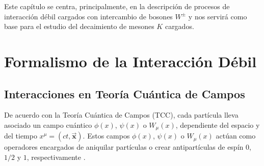 Este capítulo se centra, principalmente, en la descripción de procesos de interacción débil cargados con intercambio de bosones $W^{\pm}$ y nos servirá como base para el estudio del decaimiento de mesones $K$ cargados.

\section{Formalismo de la Interacción Débil}\label{cap:formalism}
\subsection{Interacciones en Teoría Cuántica de Campos}\label{sec:qft}
De acuerdo con la Teoría Cuántica de Campos (TCC), cada partícula lleva asociado un campo cuántico $\phi(x)$, $\psi(x)$ o $W_{\mu}(x)$, dependiente del espacio y del tiempo $x^{\mu}=(ct,\boldsymbol{\vec{x}})$\protect\footnotemark. Estos campos $\phi(x)$, $\psi(x)$ o $W_{\mu}(x)$ actúan como operadores encargados de aniquilar partículas o crear antipartículas de espín $0$, $1/2 $ y $1$, respectivamente \cite{notas2020}.

 
